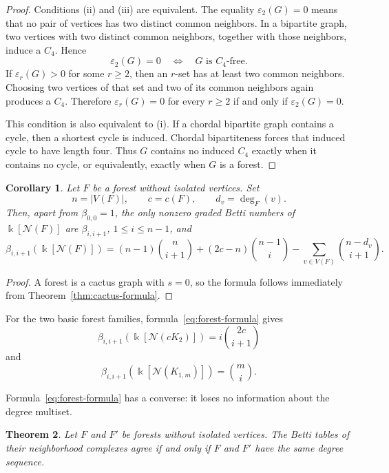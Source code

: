 \documentclass[11pt]{amsart}
\newtheorem{theorem}{Theorem}[section]
\newtheorem{corollary}[theorem]{Corollary}
\theoremstyle{definition}
\theoremstyle{remark}
\numberwithin{equation}{section}
\newcommand{\NN}{\mathcal N}
\begin{document}
	\begin{proof}
		Conditions \textup{(ii)} and \textup{(iii)} are equivalent. The equality
		\(\varepsilon_2(G)=0\) means that no pair of vertices has two distinct common
		neighbors. In a bipartite graph, two vertices with two distinct common
		neighbors, together with those neighbors, induce a \(C_4\). Hence
		\[
		\varepsilon_2(G)=0
		\quad\Longleftrightarrow\quad
		G\text{ is }C_4\text{-free}.
		\]
		If \(\varepsilon_r(G)>0\) for some \(r\ge2\), then an \(r\)-set has at least
		two common neighbors. Choosing two vertices of that set and two of its common
		neighbors again produces a \(C_4\). Therefore
		\(\varepsilon_r(G)=0\) for every \(r\ge2\) if and only if
		\(\varepsilon_2(G)=0\).

		This condition is also equivalent to \textup{(i)}. If a chordal
		bipartite graph contains a cycle, then a shortest cycle is induced. Chordal
		bipartiteness forces that induced cycle to have length four. Thus \(G\)
		contains no induced \(C_4\) exactly when it contains no cycle, or equivalently,
		exactly when \(G\) is a forest.
	\end{proof}


	\begin{corollary}\label{cor:forest-formula}
		Let \(F\) be a forest without isolated vertices. Set
		\[
		n=|V(F)|,\qquad c=c(F),\qquad d_v=\deg_F(v).
		\]
		Then, apart from \(\beta_{0,0}=1\), the only nonzero graded Betti numbers of
		\(\Bbbk[\NN(F)]\) are \(\beta_{i,i+1}\), \(1\le i\le n-1\), and
		\begin{equation}\label{eq:forest-formula}
			\beta_{i,i+1}(\Bbbk[\NN(F)])
			=
			(n-1)\binom{n}{i+1}
			+(2c-n)\binom{n-1}{i}
			-\sum_{v\in V(F)}\binom{n-d_v}{i+1}.
		\end{equation}
	\end{corollary}

	\begin{proof}
		A forest is a cactus graph with \(s=0\), so the formula follows immediately
		from Theorem~\ref{thm:cactus-formula}.
	\end{proof}

	For the two basic forest families, formula~\eqref{eq:forest-formula} gives
	\[
	\beta_{i,i+1}(\Bbbk[\NN(cK_2)])=i\binom{2c}{i+1}
	\]
	and
	\[
	\beta_{i,i+1}(\Bbbk[\NN(K_{1,m})])=\binom mi.
	\]
	
	Formula~\eqref{eq:forest-formula} has a converse: it loses no information
	about the degree multiset.

	\begin{theorem}\label{thm:forest-rigidity}
		Let \(F\) and \(F'\) be forests without isolated vertices. The Betti tables
		of their neighborhood complexes agree if and only if \(F\) and \(F'\)
		have the same degree sequence.
	\end{theorem}
\end{document}
